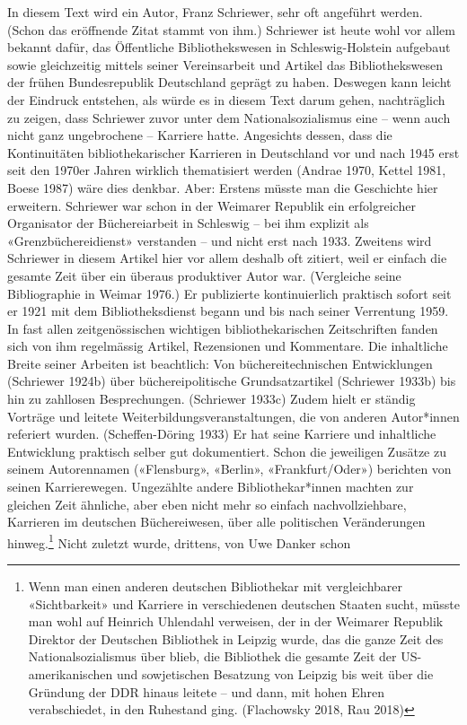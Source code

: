 \documentclass[a4paper,
fontsize=11pt,
oneside,
numbers=noperiodatend,
parskip=half-,
bibliography=totoc,
final
]{scrartcl}
\begin{document}
In diesem Text wird ein Autor, Franz Schriewer, sehr oft angeführt
werden. (Schon das eröffnende Zitat stammt von ihm.) Schriewer ist heute
wohl vor allem bekannt dafür, das Öffentliche Bibliothekswesen in
Schleswig-Holstein aufgebaut sowie gleichzeitig mittels seiner
Vereinsarbeit und Artikel das Bibliothekswesen der frühen Bundesrepublik
Deutschland geprägt zu haben. Deswegen kann leicht der Eindruck
entstehen, als würde es in diesem Text darum gehen, nachträglich zu
zeigen, dass Schriewer zuvor unter dem Nationalsozialismus eine -- wenn
auch nicht ganz ungebrochene -- Karriere hatte. Angesichts dessen, dass
die Kontinuitäten bibliothekarischer Karrieren in Deutschland vor und
nach 1945 erst seit den 1970er Jahren wirklich thematisiert werden
(Andrae 1970, Kettel 1981, Boese 1987) wäre dies denkbar. Aber: Erstens
müsste man die Geschichte hier erweitern. Schriewer war schon in der
Weimarer Republik ein erfolgreicher Organisator der Büchereiarbeit in
Schleswig -- bei ihm explizit als «Grenzbüchereidienst» verstanden --
und nicht erst nach 1933. Zweitens wird Schriewer in diesem Artikel hier
vor allem deshalb oft zitiert, weil er einfach die gesamte Zeit über ein
überaus produktiver Autor war. (Vergleiche seine Bibliographie in Weimar
1976.) Er publizierte kontinuierlich praktisch sofort seit er 1921 mit
dem Bibliotheksdienst begann und bis nach seiner Verrentung 1959. In
fast allen zeitgenössischen wichtigen bibliothekarischen Zeitschriften
fanden sich von ihm regelmässig Artikel, Rezensionen und Kommentare. Die
inhaltliche Breite seiner Arbeiten ist beachtlich: Von
büchereitechnischen Entwicklungen (Schriewer 1924b) über
büchereipolitische Grundsatzartikel (Schriewer 1933b) bis hin zu
zahllosen Besprechungen. (Schriewer 1933c) Zudem hielt er ständig
Vorträge und leitete Weiterbildungsveranstaltungen, die von anderen
Autor*innen referiert wurden. (Scheffen-Döring 1933) Er hat seine
Karriere und inhaltliche Entwicklung praktisch selber gut dokumentiert.
Schon die jeweiligen Zusätze zu seinem Autorennamen («Flensburg»,
«Berlin», «Frankfurt/Oder») berichten von seinen Karrierewegen.
Ungezählte andere Bibliothekar*innen machten zur gleichen Zeit ähnliche,
aber eben nicht mehr so einfach nachvollziehbare, Karrieren im deutschen
Büchereiwesen, über alle politischen Veränderungen hinweg.\footnote{Wenn
  man einen anderen deutschen Bibliothekar mit vergleichbarer
  «Sichtbarkeit» und Karriere in verschiedenen deutschen Staaten sucht,
  müsste man wohl auf Heinrich Uhlendahl verweisen, der in der Weimarer
  Republik Direktor der Deutschen Bibliothek in Leipzig wurde, das die
  ganze Zeit des Nationalsozialismus über blieb, die Bibliothek die
  gesamte Zeit der US-amerikanischen und sowjetischen Besatzung von
  Leipzig bis weit über die Gründung der DDR hinaus leitete -- und dann,
  mit hohen Ehren verabschiedet, in den Ruhestand ging. (Flachowsky
  2018, Rau 2018)} Nicht zuletzt wurde, drittens, von Uwe Danker schon
\end{document}
